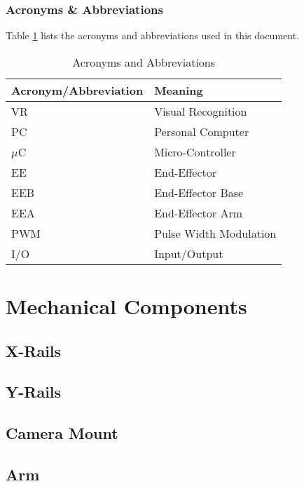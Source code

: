 \documentclass[titlepage]{article}
\begin{document}
\subsubsection{Acronyms \& Abbreviations}
Table \ref{tab:Acronyms} lists the acronyms and abbreviations used in this document.
\begin{table}[h!]
\centering
\caption{Acronyms and Abbreviations}
\begin{tabular}{| p{6cm} | p{6cm} |}\hline
	\textbf{Acronym/Abbreviation}	&\textbf{Meaning}\\\hline
	VR								&Visual Recognition\\\hline
	PC								&Personal Computer\\\hline
	$\mu$C							&Micro-Controller\\\hline
	EE								&End-Effector\\\hline
	EEB								&End-Effector Base\\\hline
	EEA								&End-Effector Arm\\\hline
	PWM								&Pulse Width Modulation\\\hline
	I/O								&Input/Output\\\hline
\end{tabular}
\label{tab:Acronyms}
\end{table}



\newpage
\section{Mechanical Components}
\subsection{X-Rails}
\subsection{Y-Rails}
\subsection{Camera Mount}
\subsection{Arm}
\end{document}
